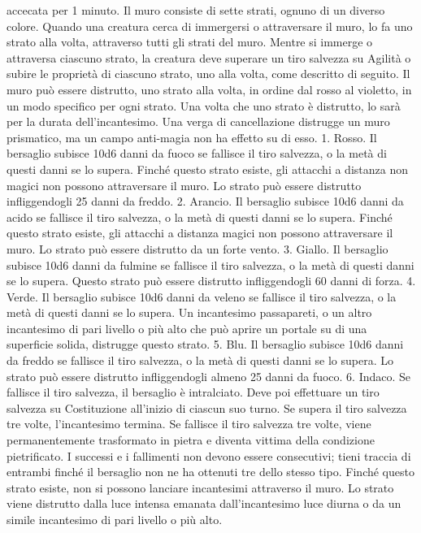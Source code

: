 \begin{multicols}{2}
accecata per 1 minuto.
Il muro consiste di sette strati, ognuno di un diverso
colore. Quando una creatura cerca di immergersi o
attraversare il muro, lo fa uno strato alla volta,
attraverso tutti gli strati del muro. Mentre si immerge o
attraversa ciascuno strato, la creatura deve superare un
tiro salvezza su Agilità o subire le proprietà di
ciascuno strato, uno alla volta, come descritto di
seguito.
Il muro può essere distrutto, uno strato alla volta, in
ordine dal rosso al violetto, in un modo specifico per
ogni strato. Una volta che uno strato è distrutto, lo sarà
per la durata dell’incantesimo. Una verga di
cancellazione distrugge un muro prismatico, ma un
campo anti-magia non ha effetto su di esso.
1. Rosso. Il bersaglio subisce 10d6 danni da fuoco se
fallisce il tiro salvezza, o la metà di questi danni se lo
supera. Finché questo strato esiste, gli attacchi a
distanza non magici non possono attraversare il muro. 
Lo strato può essere distrutto infliggendogli 25 danni da
freddo.
2. Arancio. Il bersaglio subisce 10d6 danni da acido se
fallisce il tiro salvezza, o la metà di questi danni se lo
supera. Finché questo strato esiste, gli attacchi a
distanza magici non possono attraversare il muro. Lo
strato può essere distrutto da un forte vento.
3. Giallo. Il bersaglio subisce 10d6 danni da fulmine se
fallisce il tiro salvezza, o la metà di questi danni se lo
supera. Questo strato può essere distrutto infliggendogli
60 danni di forza.
4. Verde. Il bersaglio subisce 10d6 danni da veleno se
fallisce il tiro salvezza, o la metà di questi danni se lo
supera. Un incantesimo passapareti, o un altro
incantesimo di pari livello o più alto che può aprire un
portale su di una superficie solida, distrugge questo
strato.
5. Blu. Il bersaglio subisce 10d6 danni da freddo se
fallisce il tiro salvezza, o la metà di questi danni se lo
supera. Lo strato può essere distrutto infliggendogli
almeno 25 danni da fuoco.
6. Indaco. Se fallisce il tiro salvezza, il bersaglio è
intralciato. Deve poi effettuare un tiro salvezza su
Costituzione all’inizio di ciascun suo turno. Se supera il
tiro salvezza tre volte, l’incantesimo termina. Se fallisce
il tiro salvezza tre volte, viene permanentemente
trasformato in pietra e diventa vittima della condizione
pietrificato. I successi e i fallimenti non devono essere
consecutivi; tieni traccia di entrambi finché il bersaglio
non ne ha ottenuti tre dello stesso tipo.
Finché questo strato esiste, non si possono lanciare
incantesimi attraverso il muro. Lo strato viene distrutto
dalla luce intensa emanata dall’incantesimo luce diurna
o da un simile incantesimo di pari livello o più alto.

\end{multicols}
